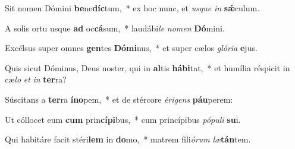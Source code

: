 \item Sit nomen Dómini \textbf{be}ne\textbf{díc}tum,~* ex hoc nunc, et \textit{us}\textit{que} \textit{in} \textbf{sǽ}culum.
\item A solis ortu usque \textbf{ad} oc\textbf{cá}sum,~* laudábi\textit{le} \textit{no}\textit{men} \textbf{Dó}mini.
\item Excélsus super omnes \textbf{gen}tes \textbf{Dó}\textbf{mi}nus,~* et super cælos \textit{gló}\textit{ri}\textit{a} \textbf{e}jus.
\item Quis sicut Dóminus, Deus noster, qui in \textbf{al}tis \textbf{há}\textbf{bi}tat,~* et humília réspicit in cæ\textit{lo} \textit{et} \textit{in} \textbf{ter}ra?
\item Súscitans a \textbf{ter}ra \textbf{ín}\textbf{o}pem,~* et de stércore \textit{é}\textit{ri}\textit{gens} \textbf{páu}perem:
\item Ut cóllocet eum \textbf{cum} prin\textbf{cí}\textbf{pi}bus,~* cum princípibus \textit{pó}\textit{pu}\textit{li} \textbf{su}i.
\item Qui habitáre facit stéri\textbf{lem} in \textbf{do}mo,~* matrem fili\textit{ó}\textit{rum} \textit{læ}\textbf{tán}tem.
